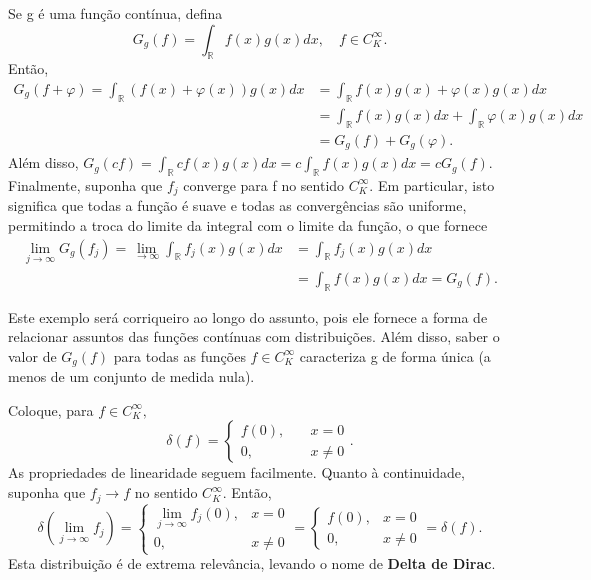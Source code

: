 \documentclass[MeasureTheory/measure_theory.tex]{subfiles}
\begin{document}
\begin{example}
	Se g é uma função contínua, defina
	\[
		G_{g}(f) = \int_{\mathbb{R}}^{}f(x)g(x)dx,\quad f\in C_{K}^{\infty}.
	\]
	Então,
	\begin{align*}
		G_{g}(f + \varphi ) = \int_{\mathbb{R}}^{}(f(x)+\varphi (x))g(x)dx & = \int_{\mathbb{R}}^{}f(x)g(x) + \varphi (x)g(x)dx                       \\
		                                                                   & = \int_{\mathbb{R}}^{}f(x)g(x)dx + \int_{\mathbb{R}}^{}\varphi (x)g(x)dx \\
		                                                                   & = G_{g}(f) + G_{g}(\varphi ).
	\end{align*}
	Além disso, \(G_{g}(cf) = \int_{\mathbb{R}}^{}cf(x)g(x)dx = c \int_{\mathbb{R}}^{}f(x)g(x)dx = cG_{g}(f).\) Finalmente, suponha que \(f_{j}\) converge para f no sentido \(C_{K}^{\infty}.\) Em particular, isto significa que todas a função é suave e todas
	as convergências são uniforme, permitindo a troca do limite da integral com o limite da função, o que fornece
	\begin{align*}
		\lim_{j\to \infty}G_{g}(f_{j}) = \lim_{\to \infty} \int_{\mathbb{R}}^{}f_{j}(x)g(x)dx & = \int_{\mathbb{R}}^{}f_{j}(x)g(x)dx         \\
		                                                                                      & = \int_{\mathbb{R}}^{}f(x)g(x)dx = G_{g}(f).
	\end{align*}
\end{example}
Este exemplo será corriqueiro ao longo do assunto, pois ele fornece a forma de relacionar assuntos das funções contínuas com distribuições. Além disso, saber o valor de \(G_{g}(f)\) para todas as funções \(f\in C_{K}^{\infty}\) caracteriza g
de forma única (a menos de um conjunto de medida nula).
\begin{example}
	Coloque, para \(f\in C_{K}^{\infty},\)
	\[
		\delta (f) = \left\{\begin{array}{ll}
			f(0), & \quad x=0     \\
			0,    & \quad x\neq 0
		\end{array}\right..
	\]
	As propriedades de linearidade seguem facilmente. Quanto à continuidade, suponha que \(f_{j}\to f\) no sentido \(C_{K}^{\infty}.\) Então,
	\[
		\delta (\lim_{j\to \infty}f_{j})  = \left\{\begin{array}{ll}
			\lim_{j\to \infty}f_{j}(0), & x = 0   \\
			0,                          & x\neq 0
		\end{array}\right.  = \left\{\begin{array}{ll}
			f(0), & x = 0   \\
			0,    & x\neq 0
		\end{array}\right. = \delta (f).
	\]
	Esta distribuição é de extrema relevância, levando o nome de \textbf{Delta de Dirac}.
\end{example}
\end{document}
